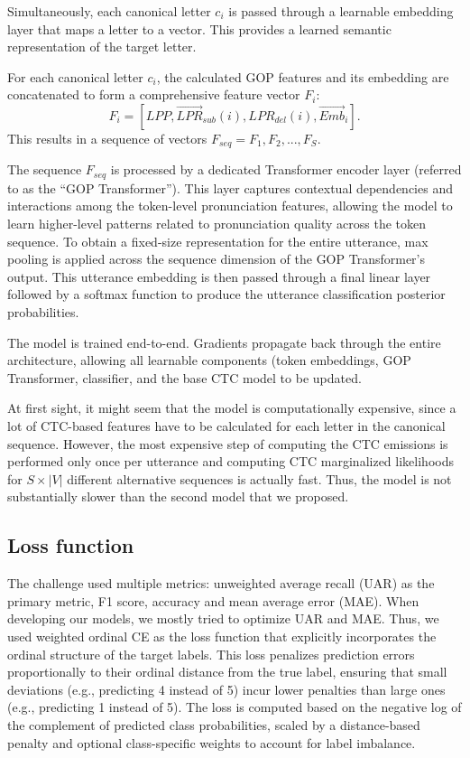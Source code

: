 \documentclass{article}
\begin{document}
Simultaneously, each canonical letter $c_i$ is passed through a learnable embedding layer that maps a letter to a vector. This provides a learned semantic representation of the target letter.

For each canonical letter $c_i$, the calculated GOP features and its embedding are concatenated to form a comprehensive feature vector $F_i$:
\[
F_i = [LPP, \vec{LPR}_{sub}(i), LPR_{del}(i), \vec{Emb}_i].
\]
This results in a sequence of vectors $F_{seq} = {F_1, F_2, ..., F_S}$.

The sequence $F_{seq}$ is processed by a dedicated Transformer encoder layer (referred to as the ``GOP Transformer'').
This layer captures contextual dependencies and interactions among the token-level pronunciation features, allowing the model to learn higher-level patterns related to pronunciation quality across the token sequence.
To obtain a fixed-size representation for the entire utterance, max pooling is applied across the sequence dimension of the GOP Transformer's output. This utterance embedding is then passed through a final linear layer followed by a softmax  function to produce the utterance classification posterior probabilities.

The model is trained end-to-end.  Gradients propagate back through the entire architecture, allowing all learnable components (token embeddings, GOP Transformer, classifier, and  the base CTC model to be updated. 

At first sight, it might seem that the model is computationally expensive, since a lot of CTC-based features have to be calculated for each letter in the canonical sequence. However, the most expensive step of computing the CTC emissions is performed only once per utterance and computing CTC marginalized likelihoods for $S \times |V|$ different alternative sequences is actually  fast. Thus, the model is not substantially slower than the second model that we proposed.


\subsection{Loss function}

The challenge used multiple metrics: unweighted average recall (UAR) as the primary metric, F1 score, accuracy and mean average error (MAE). When developing our models, we mostly tried to optimize UAR and MAE. Thus, we used weighted ordinal CE as the loss function that explicitly incorporates the ordinal structure of the target labels. This loss penalizes prediction errors proportionally to their ordinal distance from the true label, ensuring that small deviations (e.g., predicting 4 instead of 5) incur lower penalties than large ones (e.g., predicting 1 instead of 5). The loss is computed based on the negative log of the complement of predicted class probabilities, scaled by a distance-based penalty and optional class-specific weights to account for label imbalance. %
\end{document}
